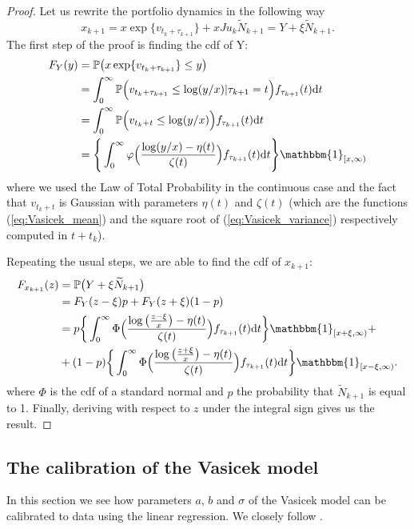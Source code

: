 \begin{proof}
	Let us rewrite the portfolio dynamics in the following way
	\[
	x_{k+1}=x\exp\{v_{t_k+\tau_{k+1}}\} + xJu_k\widetilde{N}_{k+1}=Y+\xi\widetilde{N}_{k+1}.
	\]
	The first step of the proof is finding the cdf of Y:
	\begin{align*}
	F_Y(y) & = \mathbb{P}\big(x\exp\{v_{t_k+\tau_{k+1}}\}\leq y\big)\\
	& = \int_{0}^{\infty}\mathbb{P}\Big(v_{t_k+\tau_{k+1}}\leq \log(y/x)\lvert \tau_{k+1}=t\Big)f_{\tau_{k+1}}(t)\mathrm{d}t\\
	& = \int_{0}^{\infty}\mathbb{P}\Big(v_{t_k+t}\leq \log(y/x)\Big)f_{\tau_{k+1}}(t)\mathrm{d}t\\
	& = \Bigg\{\int_{0}^{\infty}\varphi\Big(\frac{\log(y/x)-\eta(t)}{\zeta(t)}\Big)f_{\tau_{k+1}}(t)\mathrm{d}t \Bigg\}\mathbbm{1}_{[x,\infty)}
	\end{align*}
	where we used the Law of Total Probability in the continuous case and the fact that $v_{t_k+t}$ is Gaussian with parameters $\eta(t)$ and $\zeta(t)$ (which are the functions (\ref{eq:Vasicek_mean}) and the square root of (\ref{eq:Vasicek_variance}) respectively computed in $t+t_k$).
	
	
Repeating the usual steps, we are able to find the cdf of $x_{k+1}$:
\begin{align*}
F_{x_{k+1}}(z) & = \mathbb{P}\big(Y+\xi\widetilde{N}_{k+1}\big) \\
& = F_Y(z-\xi)p+F_Y(z+\xi)(1-p)\\
& = p\bigg\{ \int_{0}^{\infty}\Phi\Big(\frac{\log\big(\frac{z-\xi}{x}\big)-\eta(t)}{\zeta(t)}\Big)f_{\tau_{k+1}}(t)\mathrm{d}t\bigg\}\mathbbm{1}_{[x+\xi,\infty)}+\\
& + (1-p)\bigg\{ \int_{0}^{\infty}\Phi\Big(\frac{\log\big(\frac{z+\xi}{x}\big)-\eta(t)}{\zeta(t)}\Big)f_{\tau_{k+1}}(t)\mathrm{d}t\bigg\}\mathbbm{1}_{[x-\xi,\infty)}.
\end{align*}
where $\Phi$ is the cdf of a standard normal and $p$ the probability that $\widetilde{N}_{k+1}$ is equal to 1. Finally, deriving with respect to $z$ under the integral sign gives us the result.
\end{proof}
\subsection{The calibration of the Vasicek model}
In this section we see how parameters $a$, $b$ and $\sigma$ of the Vasicek model can be calibrated to data using the linear regression. We closely follow \cite{Bernal2016}.

